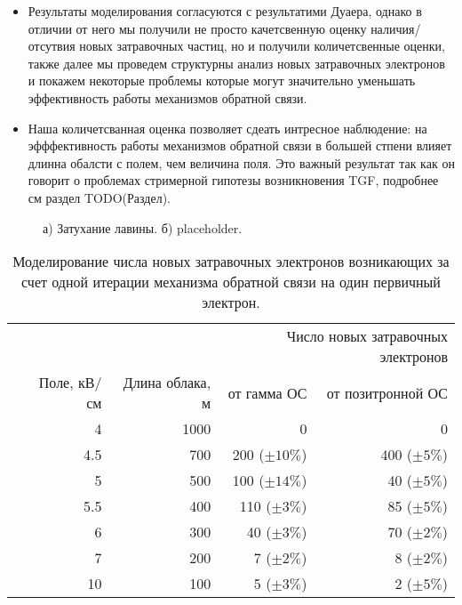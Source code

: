 \begin{itemize}
	\item Результаты моделирования согласуются с результатими Дуаера, однако в отличии от него мы получили не просто качетсвенную оценку наличия/отсутвия новых затравочных частиц, но и получили количетсвенные оценки, также далее мы проведем структурны анализ новых затравочных электронов и покажем некоторые проблемы которые могут значительно уменьшать эффективность работы механизмов обратной связи.
	\item Наша количетсванная оценка позволяет сдеать интресное наблюдение: на эфффективность работы механизмов обратной связи в большей стпени влияет длинна обалсти с полем, чем величина поля. Это важный результат так как он говорит о проблемах стримерной гипотезы возникновения TGF, подробнее см раздел TODO(Раздел). 
\end{itemize}

\begin{figure}[t]
    \begin{center}
        \begin{minipage}[h]{0.49\linewidth}
        \end{minipage}
        \hfill
        \begin{minipage}[h]{0.49\linewidth}
        \end{minipage}
        \caption{а) Затухание лавины. б) placeholder.}
    \end{center}
    \label{fig:storm:dwyer2003}
\end{figure}

\begin{table}[h]
    \centering
    \begin{tabular}{crrrr}
        \hline
        & & & \multicolumn{2}{r}{Число новых затравочных электронов} \\
        & Поле, кВ/см &  Длина облака, м  & от гамма ОС & от позитронной ОС \\
        \hline
        & 4   &  1000&  0 & 0  \\
        & 4.5 &  700 &  200 ($\pm 10 \%$)& 400 ($\pm 5 \%$) \\
        & 5   &  500 &  100 ($\pm 14 \%$)& 40 ($\pm 5 \%$) \\
        & 5.5 &  400 &  110 ($\pm 3 \%$)& 85 ($\pm 5 \%$) \\
        & 6   &  300 &  40 ($\pm 3 \%$)& 70 ($\pm 2 \%$) \\
        & 7   &  200 &  7 ($\pm 2 \%$)& 8 ($\pm 2 \%$) \\
        & 10  &  100 &  5 ($\pm 3 \%$)& 2 ($\pm 5 \%$) \\
        \hline
    \end{tabular}
    \caption{Моделирование числа новых затравочных электронов возникающих за счет одной итерации механизма обратной связи на один первичный электрон.}
    \label{tab:storm:dwyer}
\end{table}

